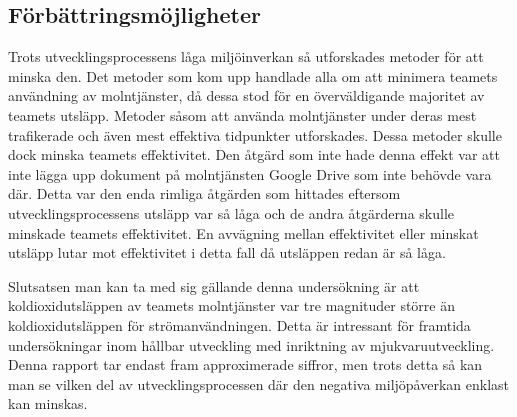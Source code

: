 \subsection{Förbättringsmöjligheter}
Trots utvecklingsprocessens låga miljöinverkan så utforskades metoder för att minska den. Det metoder som kom upp handlade alla om att minimera teamets användning av molntjänster, då dessa stod för en överväldigande majoritet av teamets utsläpp. Metoder såsom att använda molntjänster under deras mest trafikerade och även mest effektiva tidpunkter utforskades. Dessa metoder skulle dock minska teamets effektivitet. Den åtgärd som inte hade denna effekt var att inte lägga upp dokument på molntjänsten Google Drive som inte behövde vara där. Detta var den enda rimliga åtgärden som hittades eftersom utvecklingsprocessens utsläpp var så låga och de andra åtgärderna skulle minskade teamets effektivitet. En avvägning mellan effektivitet eller minskat utsläpp lutar mot effektivitet i detta fall då utsläppen redan är så låga.

Slutsatsen man kan ta med sig gällande denna undersökning är att koldioxidutsläppen av teamets molntjänster var tre magnituder större än koldioxidutsläppen för strömanvändningen. Detta är intressant för framtida undersökningar inom hållbar utveckling med inriktning av mjukvaruutveckling. Denna rapport tar endast fram approximerade siffror, men trots detta så kan man se vilken del av utvecklingsprocessen där den negativa miljöpåverkan enklast kan minskas.